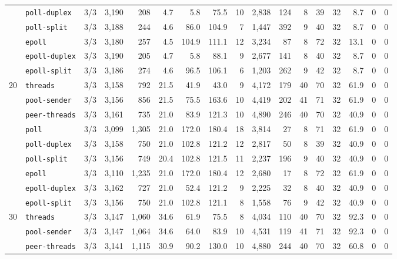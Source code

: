\begin{longtable}{@{}llrrrrrrrrrrrrrrr@{}}
 & \texttt{poll-duplex} & 3/3 & 3{,}190 & 208 & 4.7 & 5.8 & 75.5 & 10 & 2{,}838 & 124 & 8 & 39 & 32 & 8.7 & 0 & 0 \\
 & \texttt{poll-split} & 3/3 & 3{,}188 & 244 & 4.6 & 86.0 & 104.9 & 7 & 1{,}447 & 392 & 9 & 40 & 32 & 8.7 & 0 & 0 \\
 & \texttt{epoll} & 3/3 & 3{,}180 & 257 & 4.5 & 104.9 & 111.1 & 12 & 3{,}234 & 87 & 8 & 72 & 32 & 13.1 & 0 & 0 \\
 & \texttt{epoll-duplex} & 3/3 & 3{,}190 & 205 & 4.7 & 5.8 & 88.1 & 9 & 2{,}677 & 141 & 8 & 40 & 32 & 8.7 & 0 & 0 \\
 & \texttt{epoll-split} & 3/3 & 3{,}186 & 274 & 4.6 & 96.5 & 106.1 & 6 & 1{,}203 & 262 & 9 & 42 & 32 & 8.7 & 0 & 0 \\
\midrule
20 & \texttt{threads} & 3/3 & 3{,}158 & 792 & 21.5 & 41.9 & 43.0 & 9 & 4{,}172 & 179 & 40 & 70 & 32 & 61.9 & 0 & 0 \\
 & \texttt{pool-sender} & 3/3 & 3{,}156 & 856 & 21.5 & 75.5 & 163.6 & 10 & 4{,}419 & 202 & 41 & 71 & 32 & 61.9 & 0 & 0 \\
 & \texttt{peer-threads} & 3/3 & 3{,}161 & 735 & 21.0 & 83.9 & 121.3 & 10 & 4{,}890 & 246 & 40 & 70 & 32 & 40.9 & 0 & 0 \\
 & \texttt{poll} & 3/3 & 3{,}099 & 1{,}305 & 21.0 & 172.0 & 180.4 & 18 & 3{,}814 & 27 & 8 & 71 & 32 & 61.9 & 0 & 0 \\
 & \texttt{poll-duplex} & 3/3 & 3{,}158 & 750 & 21.0 & 102.8 & 121.2 & 12 & 2{,}817 & 50 & 8 & 39 & 32 & 40.9 & 0 & 0 \\
 & \texttt{poll-split} & 3/3 & 3{,}156 & 749 & 20.4 & 102.8 & 121.5 & 11 & 2{,}237 & 196 & 9 & 40 & 32 & 40.9 & 0 & 0 \\
 & \texttt{epoll} & 3/3 & 3{,}110 & 1{,}235 & 21.0 & 172.0 & 180.4 & 12 & 2{,}680 & 17 & 8 & 72 & 32 & 61.9 & 0 & 0 \\
 & \texttt{epoll-duplex} & 3/3 & 3{,}162 & 727 & 21.0 & 52.4 & 121.2 & 9 & 2{,}225 & 32 & 8 & 40 & 32 & 40.9 & 0 & 0 \\
 & \texttt{epoll-split} & 3/3 & 3{,}156 & 750 & 21.0 & 102.8 & 121.1 & 8 & 1{,}558 & 76 & 9 & 42 & 32 & 40.9 & 0 & 0 \\
\midrule
30 & \texttt{threads} & 3/3 & 3{,}147 & 1{,}060 & 34.6 & 61.9 & 75.5 & 8 & 4{,}034 & 110 & 40 & 70 & 32 & 92.3 & 0 & 0 \\
 & \texttt{pool-sender} & 3/3 & 3{,}147 & 1{,}064 & 34.6 & 64.0 & 83.9 & 10 & 4{,}531 & 119 & 41 & 71 & 32 & 92.3 & 0 & 0 \\
 & \texttt{peer-threads} & 3/3 & 3{,}141 & 1{,}115 & 30.9 & 90.2 & 130.0 & 10 & 4{,}880 & 244 & 40 & 70 & 32 & 60.8 & 0 & 0 \\

\end{longtable}
